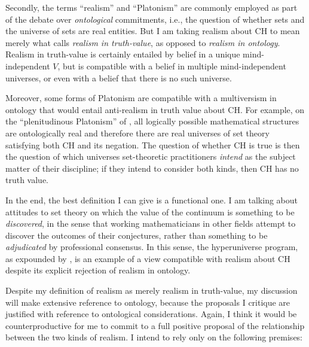 \documentclass[letterpaper,12pt]{article}
\begin{document}

Secondly, the terms ``realism'' and ``Platonism'' are commonly employed as part of the debate over \emph{ontological} commitments, i.e., the question of whether sets and the universe of sets are real entities. But I am taking realism about CH to mean merely what \cite{Shapiro2000-SHATAM} calls \emph{realism in truth-value}, as opposed to \emph{realism in ontology}. Realism in truth-value is certainly entailed by belief in a unique mind-independent $V$, but is compatible with a belief in multiple mind-independent universes, or even with a belief that there is no such universe.

Moreover, some forms of Platonism are compatible with a multiversism in ontology that would entail anti-realism in truth value about CH. For example, on the ``plenitudinous Platonism'' of \cite{Balaguer1998-BALPAA-3}, all logically possible mathematical structures are ontologically real and therefore there are real universes of set theory satisfying both CH and its negation. The question of whether CH is true is then the question of which universes set-theoretic practitioners \emph{intend} as the subject matter of their discipline; if they intend to consider both kinds, then CH has no truth value.

In the end, the best definition I can give is a functional one. I am talking about attitudes to set theory on which the value of the continuum is something to be \emph{discovered}, in the sense that working mathematicians in other fields attempt to discover the outcomes of their conjectures, rather than something to be \emph{adjudicated} by professional consensus. In this sense, the hyperuniverse program, as expounded by \cite{arrigoni2013hyperuniverse}, is an example of a view compatible with realism about CH despite its explicit rejection of realism in ontology.

Despite my definition of realism as merely realism in truth-value, my discussion will make extensive reference to ontology, because the proposals I critique are justified with reference to ontological considerations. Again, I think it would be counterproductive for me to commit to a full positive proposal of the relationship between the two kinds of realism. I intend to rely only on the following premises:
\end{document}
